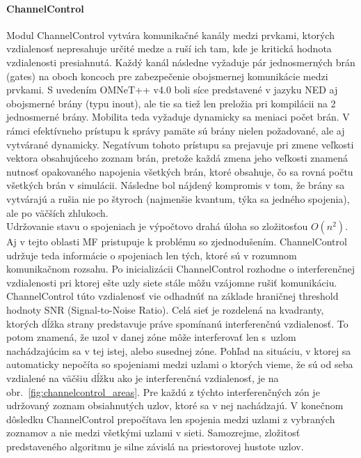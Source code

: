 \paragraph{ChannelControl}
\indent Modul \ttfamily ChannelControl \rmfamily vytvára komunikačné kanály medzi prvkami, ktorých vzdialenosť nepresahuje určité medze a ruší ich tam, kde je kritická hodnota vzdialenosti presiahnutá. Každý kanál následne vyžaduje pár jednosmerných brán (\ttfamily gates\rmfamily) na oboch koncoch pre zabezpečenie obojsmernej komunikácie medzi prvkami. S uvedením OMNeT++ v4.0 boli síce predstavené v jazyku NED aj obojsmerné brány (typu \ttfamily inout\rmfamily), ale tie sa tiež len preložia pri kompilácii na 2 jednosmerné brány. Mobilita teda vyžaduje dynamicky sa meniaci počet brán. V rámci efektívneho prístupu k správy pamäte sú brány nielen požadované, ale aj vytvárané dynamicky. Negatívum tohoto prístupu sa prejavuje pri zmene veľkosti vektora obsahujúceho zoznam brán, pretože každá zmena jeho veľkosti znamená nutnosť opakovaného napojenia všetkých brán, ktoré obsahuje, čo sa rovná počtu všetkých brán v simulácii. Následne bol nájdený kompromis v tom, že brány sa vytvárajú a rušia nie po štyroch (najmenšie kvantum, týka sa jedného spojenia), ale po väčších zhlukoch.\\
\indent Udržovanie stavu o spojeniach je výpočtovo drahá úloha so zložitosťou $O(n^2)$. Aj v tejto oblasti MF pristupuje k problému so zjednodušením. \ttfamily ChannelControl \rmfamily udržuje teda informácie o spojeniach len tých, ktoré sú v rozumnom komunikačnom rozsahu. Po inicializácii \ttfamily ChannelControl \rmfamily rozhodne o interferenčnej vzdialenosti pri ktorej ešte uzly siete stále môžu vzájomne rušiť komunikáciu. \ttfamily ChannelControl \rmfamily túto vzdialenosť vie odhadnúť na základe hraničnej threshold hodnoty SNR (Signal-to-Noise Ratio). Celá sieť je rozdelená na kvadranty, ktorých dĺžka strany predstavuje práve spomínanú interferenčnú vzdialenosť. To potom znamená, že uzol v danej zóne môže interferovať len s~uzlom nachádzajúcim sa v tej istej, alebo susednej zóne. Pohľad na situáciu, v ktorej sa automaticky nepočíta so spojeniami medzi uzlami o ktorých vieme, že sú od seba vzdialené na väčšiu dĺžku ako je interferenčná vzdialenosť, je na obr.~\ref{fig:channelcontrol_areas}. Pre každú z týchto interferenčných zón je udržovaný zoznam obsiahnutých uzlov, ktoré sa v nej nachádzajú. V konečnom dôsledku \ttfamily ChannelControl \rmfamily prepočítava len spojenia medzi uzlami z vybraných zoznamov a nie medzi všetkými uzlami v sieti. Samozrejme, zložitosť predstaveného algoritmu je silne závislá na priestorovej hustote uzlov.\\

